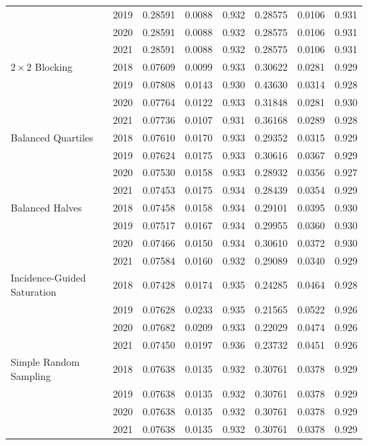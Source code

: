 \documentclass[11pt]{article}
\begin{document}
\begin{table}[!htb]
\begin{tabular}{llrrrrrr}
 & 2019 & 0.28591 & 0.0088 & 0.932 & 0.28575 & 0.0106 & 0.931 \\
 & 2020 & 0.28591 & 0.0088 & 0.932 & 0.28575 & 0.0106 & 0.931 \\
 & 2021 & 0.28591 & 0.0088 & 0.932 & 0.28575 & 0.0106 & 0.931 \\
\addlinespace
$2\times2$ Blocking & 2018 & 0.07609 & 0.0099 & 0.933 & 0.30622 & 0.0281 & 0.929 \\
 & 2019 & 0.07808 & 0.0143 & 0.930 & 0.43630 & 0.0314 & 0.928 \\
 & 2020 & 0.07764 & 0.0122 & 0.933 & 0.31848 & 0.0281 & 0.930 \\
 & 2021 & 0.07736 & 0.0107 & 0.931 & 0.36168 & 0.0289 & 0.928 \\
\addlinespace
Balanced Quartiles & 2018 & 0.07610 & 0.0170 & 0.933 & 0.29352 & 0.0315 & 0.929 \\
 & 2019 & 0.07624 & 0.0175 & 0.933 & 0.30616 & 0.0367 & 0.929 \\
 & 2020 & 0.07530 & 0.0158 & 0.933 & 0.28932 & 0.0356 & 0.927 \\
 & 2021 & 0.07453 & 0.0175 & 0.934 & 0.28439 & 0.0354 & 0.929 \\
\addlinespace
Balanced Halves & 2018 & 0.07458 & 0.0158 & 0.934 & 0.29101 & 0.0395 & 0.930 \\
 & 2019 & 0.07517 & 0.0167 & 0.934 & 0.29955 & 0.0360 & 0.930 \\
 & 2020 & 0.07466 & 0.0150 & 0.934 & 0.30610 & 0.0372 & 0.930 \\
 & 2021 & 0.07584 & 0.0160 & 0.932 & 0.29089 & 0.0340 & 0.929 \\
\addlinespace
Incidence-Guided Saturation & 2018 & 0.07428 & 0.0174 & 0.935 & 0.24285 & 0.0464 & 0.928 \\
 & 2019 & 0.07628 & 0.0233 & 0.935 & 0.21565 & 0.0522 & 0.926 \\
 & 2020 & 0.07682 & 0.0209 & 0.933 & 0.22029 & 0.0474 & 0.926 \\
 & 2021 & 0.07450 & 0.0197 & 0.936 & 0.23732 & 0.0451 & 0.926 \\
\addlinespace
Simple Random Sampling & 2018 & 0.07638 & 0.0135 & 0.932 & 0.30761 & 0.0378 & 0.929 \\
 & 2019 & 0.07638 & 0.0135 & 0.932 & 0.30761 & 0.0378 & 0.929 \\
 & 2020 & 0.07638 & 0.0135 & 0.932 & 0.30761 & 0.0378 & 0.929 \\
 & 2021 & 0.07638 & 0.0135 & 0.932 & 0.30761 & 0.0378 & 0.929 \\
\bottomrule
\end{tabular}
\end{table}
\end{document}
